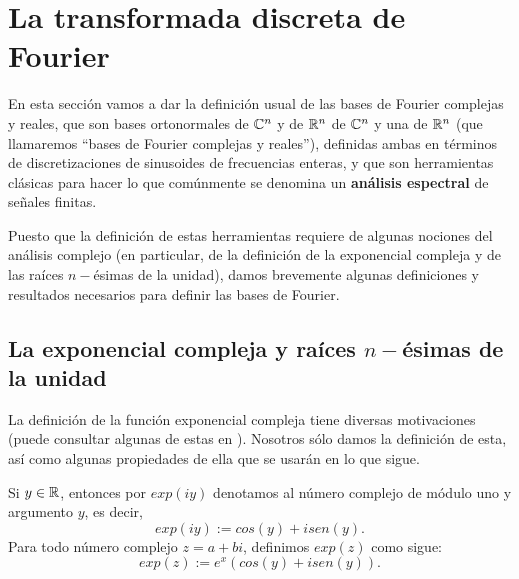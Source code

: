 \section{La transformada discreta de Fourier}
\label{sec: TDF}

En esta sección vamos a dar la definición usual de 
las bases de Fourier complejas y reales, que son
bases ortonormales de $\mathbb{C}^{n}$ y de $\mathbb{R}^{n}$ 
de $\mathbb{C}^{n}$
y una de $\mathbb{R}^{n}$ (que llamaremos
``bases de Fourier complejas y reales''),
definidas ambas en términos de discretizaciones de
sinusoides de frecuencias enteras, y que son herramientas
clásicas para hacer lo que comúnmente se denomina
un \textbf{análisis espectral} de señales finitas.


Puesto que la definición de estas herramientas requiere
de algunas nociones del análisis complejo (en particular, de la
definición de la exponencial compleja y de las raíces $n-$ésimas
de la unidad), damos brevemente algunas definiciones y resultados
necesarios para definir las bases de Fourier.


\subsection{La exponencial compleja y raíces $n-$ésimas de la unidad}


La definición de la función exponencial compleja 
tiene diversas motivaciones
(puede consultar algunas de estas en 
\cite{marsden}). Nosotros sólo
damos la definición de esta, así como algunas propiedades
de ella que se usarán en lo que sigue.

\begin{defi}
\label{def: exponencial compleja}
Si $y \in \mathbb{R}$, entonces por $exp(iy)$ denotamos al número
complejo de módulo uno y argumento $y$, es decir,
\begin{equation}
\label{eq: exponencial 1}
exp(iy) := cos(y) + i sen(y).
\end{equation}
Para todo número complejo $z = a+bi$, definimos 
$exp(z)$ como sigue:
\begin{equation}
\label{eq: exponencial 2}
exp(z) := e^{x}(cos(y) + i sen(y)).
\end{equation}
\end{defi}


